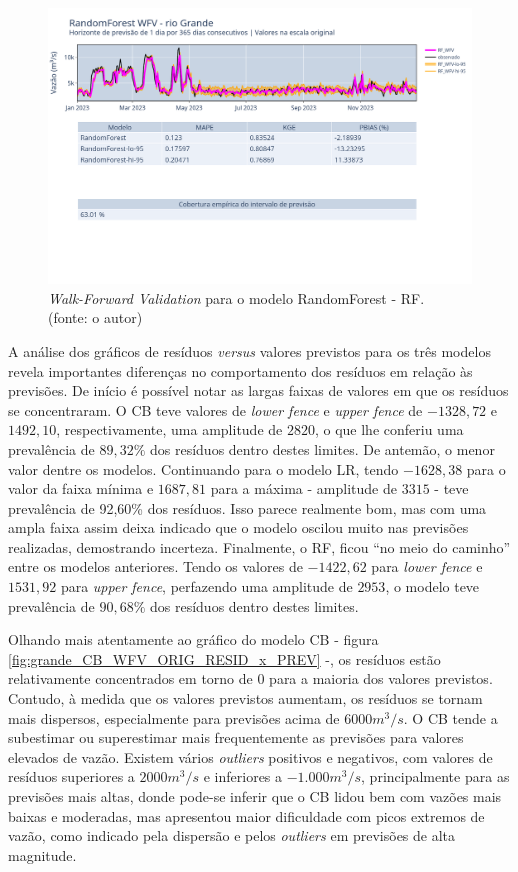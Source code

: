 \begin{figure}[!h]
\centering
\includegraphics[scale=0.33]{Figuras/rio_grande/wfv/RF/RF_WFV_ORIG.png}
\caption{\textit{Walk-Forward Validation} para o modelo RandomForest - RF.\\(fonte: o autor)}
\label{fig:grande_RF_WFV_ORIG}
\end{figure}
\clearpage

A análise dos gráficos de resíduos \textit{versus} valores previstos para os três modelos revela importantes diferenças no comportamento dos resíduos em relação às previsões. De início é possível notar as largas faixas de valores em que os resíduos se concentraram. O CB teve valores de \textit{lower fence} e \textit{upper fence} de $-1328,72$ e $1492,10$, respectivamente, uma amplitude de $2820$, o que lhe conferiu uma prevalência de $89,32\%$ dos resíduos dentro destes limites. De antemão, o menor valor dentre os modelos. Continuando para o modelo LR, tendo $-1628,38$ para o valor da faixa mínima e $1687,81$ para a máxima - amplitude de $3315$ - teve prevalência de 92,60\% dos resíduos. Isso parece realmente bom, mas com uma ampla faixa assim deixa indicado que o modelo oscilou muito nas previsões realizadas, demostrando incerteza. Finalmente, o RF, ficou ``no meio do caminho'' entre os modelos anteriores. Tendo os valores de $-1422,62$ para \textit{lower fence} e $1531,92$ para \textit{upper fence}, perfazendo uma amplitude de $2953$, o modelo teve prevalência de $90,68\%$ dos resíduos dentro destes limites.

Olhando mais atentamente ao gráfico do modelo CB - figura \ref{fig:grande_CB_WFV_ORIG_RESID_x_PREV} -, os resíduos estão relativamente concentrados em torno de $0$ para a maioria dos valores previstos. Contudo, à medida que os valores previstos aumentam, os resíduos se tornam mais dispersos, especialmente para previsões acima de $6000 m^3/s$. O CB tende a subestimar ou superestimar mais frequentemente as previsões para valores elevados de vazão. Existem vários \textit{outliers} positivos e negativos, com valores de resíduos superiores a $2000 m^3/s$ e inferiores a $-1.000 m^3/s$, principalmente para as previsões mais altas, donde pode-se inferir que o CB lidou bem com vazões mais baixas e moderadas, mas apresentou maior dificuldade com picos extremos de vazão, como indicado pela dispersão e pelos \textit{outliers} em previsões de alta magnitude.

